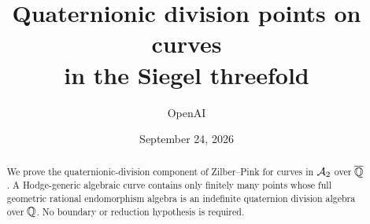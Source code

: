 \documentclass[11pt]{article}
\title{Quaternionic division points on curves\\in the Siegel threefold}
\author{OpenAI}
\date{September 24, 2026}
\begin{document}
\maketitle
\begin{abstract}
We prove the quaternionic-division component of Zilber--Pink for curves
in \(\mathcal A_2\) over \(\overline{\mathbb Q}\). A Hodge-generic algebraic curve contains
only finitely many points whose full geometric rational endomorphism
algebra is an indefinite quaternion division algebra over \(\mathbb Q\).
No boundary or reduction hypothesis is required.
\end{abstract}
\begingroup
\small
\tableofcontents
\endgroup
\clearpage








\end{document}
